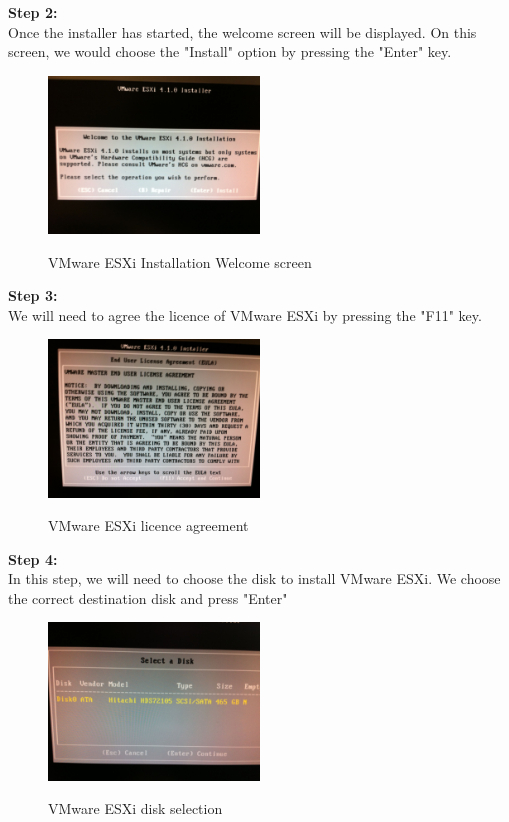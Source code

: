 \textbf{Step 2:}\\
Once the installer has started, the welcome screen will be displayed. On this screen, we would choose the "Install" option by pressing the "Enter" key. 

\begin{figure}[ht]
	\caption{VMware ESXi Installation Welcome screen}
  	\centering
	\includegraphics[width=0.5\textwidth]{./pic/esxi_2.jpg}
	\label{fig:kex_object_creation}
\end{figure}

\pagebreak
\textbf{Step 3:}\\
We will need to agree the licence of VMware ESXi by pressing the "F11" key. 
\begin{figure}[ht]
	\caption{VMware ESXi licence agreement}
  	\centering
	\includegraphics[width=0.5\textwidth]{./pic/esxi_3.jpg}
	\label{fig:kex_object_creation}
\end{figure}

\textbf{Step 4:}\\
In this step, we will need to choose the disk to install VMware ESXi. We choose the correct destination disk and press "Enter"
\begin{figure}[ht]
	\caption{VMware ESXi disk selection}
  	\centering
	\includegraphics[width=0.5\textwidth]{./pic/esxi_4.jpg}
	\label{fig:kex_object_creation}
\end{figure}

